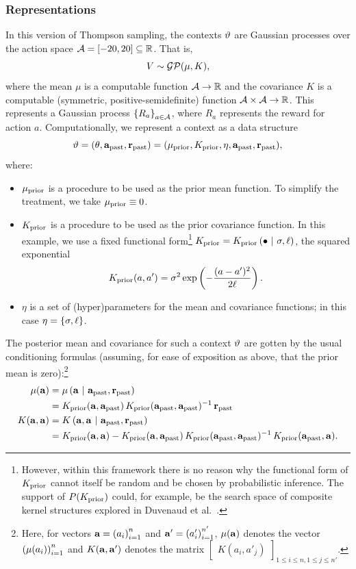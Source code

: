 \subsubsection{Representations}
In this version of Thompson sampling, the contexts $\vartheta$ are Gaussian
processes over the action space $\mathcal{A} = [-20, 20] \subseteq \mathbb{R}$.  That is,
\[ V \sim \mathcal{GP}(\mu, K), \]
where the mean $\mu$ is a computable function $\mathcal{A} \to \mathbb{R}$ and the covariance
$K$ is a computable (symmetric, positive-semidefinite) function $\mathcal{A} \times
\mathcal{A} \to \mathbb{R}$.  This represents a Gaussian process $\left\{ R_a \right\}_{a \in \mathcal{A}}$,
where $R_a$ represents the reward for action $a$.  Computationally, we represent
a context as a data structure
\[ \vartheta = (\theta, \mathbf{a}_{\textrm{past}}, \mathbf{r}_{\textrm{past}}) = (\mu_{\textrm{prior}}, K_{\textrm{prior}}, \eta, \mathbf{a}_{\textrm{past}}, \mathbf{r}_{\textrm{past}}), \]
where:
\begin{itemize}
  \item $\mu_{\textrm{prior}}$ is a procedure to be used as the prior mean function.  To
    simplify the treatment, we take $\mu_{\textrm{prior}} \equiv 0$.
  \item $K_{\textrm{prior}}$ is a procedure to be used as the prior covariance function.
    In this example, we use a fixed functional form\footnote{
      However, within this framework there is no reason why the functional form
      of $K_{\textrm{prior}}$ cannot itself be random and be chosen by probabilistic
      inference.  The support of $P(K_{\textrm{prior}})$ could, for example, be the search
      space of composite kernel structures explored in Duvenaud et
      al.~\cite{Duvenaud}.
    }
    $K_{\textrm{prior}} = K_{\textrm{prior}}\left( \bullet \ \middle\vert\  \sigma,\ell \right)$, the squared exponential
    \[ K_{\textrm{prior}}(a,a') = \sigma^2 \exp\left( -\frac{(a-a')^2}{2\ell} \right). \]
  \item $\eta$ is a set of (hyper)parameters for the mean and covariance
    functions; in this case $\eta = \left\{ \sigma, \ell \right\}$.
\end{itemize}
The posterior mean and covariance for such a context $\vartheta$ are gotten by the
usual conditioning formulas (assuming, for ease of exposition as above, that the
prior mean is zero):\footnote{
  Here, for vectors $\mathbf{a} = \left( a_i \right)_{i=1}^{n}$ and $\mathbf{a}' =
  \left( a'_i \right)_{i=1}^{n'}$, $\mu(\mathbf{a})$ denotes the vector
  $\left( \mu(a_i) \right)_{i=1}^{n}$ and $K(\mathbf{a},\mathbf{a}')$ denotes the matrix
  $\begin{bmatrix} K(a_i, a'_j) \end{bmatrix}_{1 \leq i \leq n, 1 \leq j
  \leq n'}$.
}
\begin{align*}
  \mu(\mathbf{a})
  &= \mu\left( \mathbf{a} \ \middle\vert\  \mathbf{a}_{\textrm{past}}, \mathbf{r}_{\textrm{past}} \right) \\
  &= K_{\textrm{prior}}(\mathbf{a}, \mathbf{a}_{\textrm{past}})
     \,K_{\textrm{prior}}(\mathbf{a}_{\textrm{past}}, \mathbf{a}_{\textrm{past}})^{-1}
     \,\mathbf{r}_{\textrm{past}} \\
  K(\mathbf{a}, \mathbf{a})
  &= K\left( \mathbf{a}, \mathbf{a} \ \middle\vert\  \mathbf{a}_{\textrm{past}}, \mathbf{r}_{\textrm{past}} \right) \\
  &= K_{\textrm{prior}}(\mathbf{a}, \mathbf{a})
     - K_{\textrm{prior}}(\mathbf{a}, \mathbf{a}_{\textrm{past}})
       \,K_{\textrm{prior}}(\mathbf{a}_{\textrm{past}}, \mathbf{a}_{\textrm{past}})^{-1}
       \,K_{\textrm{prior}}(\mathbf{a}_{\textrm{past}}, \mathbf{a}).
\end{align*}

